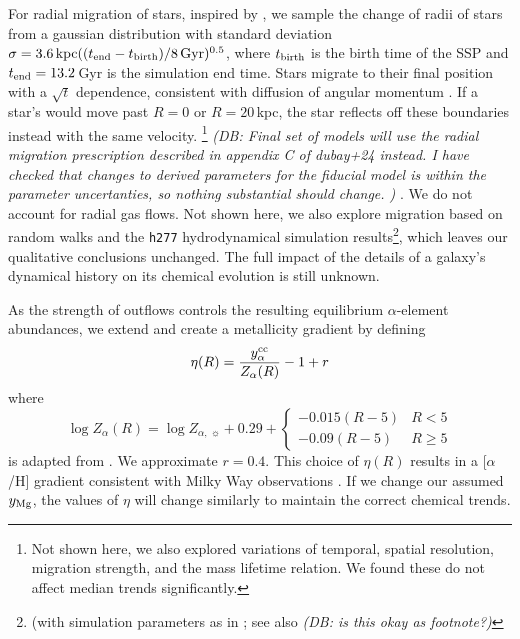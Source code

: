 \documentclass[fleqn,
referee, %
usenatbib]{mnras}
\newcommand{\JJ}{\citetalias{james+21}}
\newcommand{\dbnote}[1]{ {\color{Thistle} \textit{\small (DB: #1)}} }
\begin{document}
For radial migration of stars, inspired by \citet{frankel18}, we sample the change of radii of stars from a gaussian distribution with standard deviation $\sigma = 3.6\,{\rm kpc} ((t_{\rm end} - t_{\rm birth})/8\,{\rm Gyr})^{0.5}$, where $t_{\rm birth}$ is the birth time of the SSP and $t_{\rm end}=13.2$\,Gyr is the simulation end time.
Stars migrate to their final position with a $\sqrt{t}$ dependence, consistent with diffusion of angular momentum \citep{frankel18, frankel20}. If a star's would move past $R=0$ or $R=20\,$kpc, the star reflects off these boundaries instead with the same velocity.%
\footnote{Not shown here, we also explored variations of temporal, spatial resolution, migration strength, and the mass lifetime relation. We found these do not affect median trends significantly.}
\dbnote{ Final set of models will use the radial migration prescription described in appendix C of {dubay+24} instead. I have checked that changes to derived parameters for the fiducial model is within the parameter uncertanties, so nothing substantial should change. }.
We do not account for radial gas flows.
Not shown here, we also explore migration based on random walks and the \texttt{h277} hydrodynamical
simulation results\footnote{(with simulation parameters as in \citealt{bird+21}; see also \citealt{christensen12, zolotov12, loebman12, BZ14} \dbnote{is this okay as footnote?} }, which leaves our qualitative conclusions unchanged. 
The full impact of the details of a galaxy's dynamical history on its chemical evolution is still unknown.

As the strength of outflows controls the resulting equilibrium $\alpha$-element abundances, we extend \JJ and create a metallicity gradient by defining
\begin{equation}\label{eq:mass_loading}
\eta(R) = \frac{y_{\alpha}^{\rm cc}}{Z_{\alpha}(R)} -1 + r %
\end{equation}
where 
\begin{equation}
    \log Z_{\alpha}(R) = \log Z_{\alpha,\ \sun} + 
    0.29 + 
    \begin{cases}
        -0.015(R-5) & R < 5 \\
        -0.09(R-5) & R \geq 5
    \end{cases}
\end{equation}
is adapted from \citet{hayden+14}.  We approximate $r=0.4$. %
This choice of $\eta(R)$ results in a [$\alpha$/H] gradient consistent with Milky Way observations \citep[e.g.][]{hayden+14, weinberg+19, frinchaboy+13}.
If we change our assumed $y_{\rm Mg}$, the values of $\eta$ will change similarly to maintain the correct chemical trends.
\end{document}
